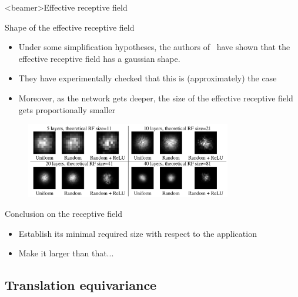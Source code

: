 \documentclass[xcolor=pdftex,dvipsnames,table,mathserif]{beamer}
\begin{document}
\begin{frame}<beamer>{Effective receptive field}

\begin{block}{Shape of the effective receptive field}
\begin{itemize}
\item   Under some simplification hypotheses, the authors of~\cite{luo_understanding_2017} have shown that the effective receptive field has a gaussian shape.
  \item They have experimentally checked that this is (approximately) the case
  \item Moreover, as the network gets deeper, the size of the effective receptive field gets proportionally smaller
\end{itemize}

\end{block}

  \begin{figure}
    \includegraphics[width=0.8\textwidth]{effective_receptive_field.png}
  \end{figure}



\end{frame}


\begin{frame}{Conclusion on the receptive field}

\begin{itemize}
\item Establish its minimal required size with respect to the application
\item Make it larger than that...
\end{itemize}

\end{frame}


\subsection{Translation equivariance}
\end{document}

